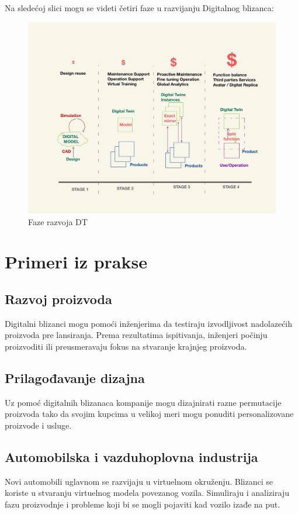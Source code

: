 \documentclass[a4paper]{article}
\begin{document}
{Na sledećoj slici mogu se videti četiri faze u razvijanju Digitalnog blizanca:\\
\begin{figure}[h!]
	\begin{center}
		\includegraphics[scale=0.15]{7_faze_razvoja.jpg}
	\end{center}
	\caption{Faze razvoja DT\cite{economics}}
\end{figure}
\section{Primeri iz prakse}
\label{sec:primeri}

\subsection{Razvoj proizvoda}
Digitalni blizanci mogu pomoći inženjerima da testiraju izvodljivost nadolazećih proizvoda pre
lansiranja. Prema rezultatima ispitivanja, inženjeri počinju proizvoditi ili preusmeravaju fokus na
stvaranje krajnjeg proizvoda. \cite{lider}

\subsection{Prilagođavanje dizajna}
Uz pomoć digitalnih blizanaca kompanije mogu dizajnirati razne permutacije proizvoda tako da
svojim kupcima u velikoj meri mogu ponuditi personalizovane proizvode i usluge. \cite{lider}

\subsection{Automobilska i vazduhoplovna industrija}
Novi automobili uglavnom se razvijaju u virtuelnom okruženju. Blizanci se koriste u stvaranju
virtuelnog modela povezanog vozila. Simuliraju i analiziraju fazu proizvodnje i probleme koji bi
se mogli pojaviti kad vozilo izađe na put.\cite{lider}

}
\end{document}

